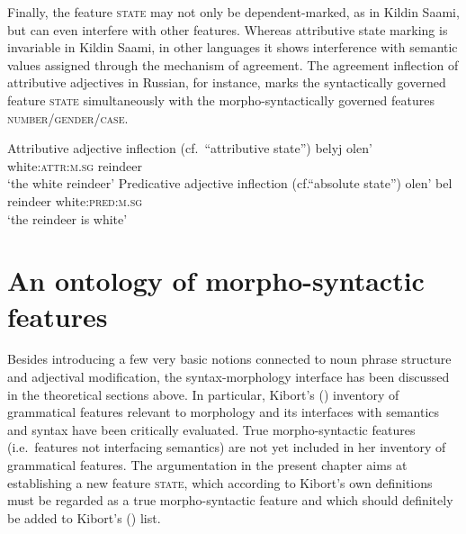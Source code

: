 Finally, the feature \textsc{state} may not only be dependent-marked, as in Kildin Saami, but can even interfere with other features. Whereas attributive state marking is invariable in Kildin Saami, in other languages it shows interference with semantic values assigned through the mechanism of agreement. The agreement inflection of attributive adjectives in Russian, for instance, marks the syntactically governed feature \textsc{state} simultaneously with the morpho-syn\-tacti\-cally governed features \textsc{number/\-gender/\-case}.
\begin{exe}
\label{state np russian}
\begin{xlist}
\ex Attributive adjective inflection (cf.~“attributive state”)
\gll 	belyj	olen'\\
	white:\textsc{attr:m.sg}	reindeer\\
\glt 	‘the white reindeer’
\ex	Predicative adjective inflection (cf.“absolute state”)
\gll	olen' bel\\
	reindeer white:\textsc{pred:m.sg}\\
\glt	‘the reindeer is white’
\end{xlist}
\end{exe}

\section{An ontology of morpho-syntactic features}

Besides introducing a few very basic notions connected to noun phrase structure and adjectival modification, the syntax-morphology interface has been discussed in the theoretical sections above. In particular, Kibort's (\citeyear{kibort2008a}) inventory of grammatical features relevant to morphology and its interfaces with semantics and syntax have been critically evaluated. True morpho-syntactic features (i.e.~features not interfacing semantics) are not yet included in her inventory of grammatical features. The argumentation in the present chapter aims at establishing a new feature \textsc{state}, which according to Kibort's own definitions must be regarded as a true morpho-syntactic feature and which should definitely be added to Kibort's (\citeyear{kibort2008a}) list. 

